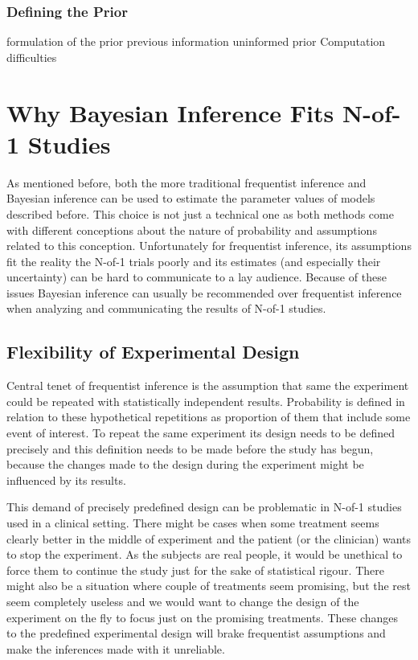 \documentclass[12pt,a4paper,leqno]{report}
\theoremstyle{plain}
\theoremstyle{definition}
\theoremstyle{remark}
\begin{document}
\subsubsection{Defining the Prior}\label{bayesproblems}

formulation of the prior
previous information
uninformed prior
Computation difficulties

\section{Why Bayesian Inference Fits N-of-1 Studies}\label{whybayes}

As mentioned before, both the more traditional frequentist inference and Bayesian inference can
be used to estimate the parameter values of models described before. This choice is not just a technical
one as both methods come with different conceptions about the nature of probability and assumptions
related to this conception. Unfortunately for frequentist inference, its assumptions fit the reality
the N-of-1 trials poorly and its estimates (and especially their uncertainty) can be hard to communicate
to a lay audience. Because of these issues Bayesian inference can usually be recommended over frequentist
inference when analyzing and communicating the results of N-of-1 studies.

\subsection{Flexibility of Experimental Design}\label{whybayes}

Central tenet of frequentist inference is the assumption that same the experiment could be repeated with
statistically independent results. Probability is defined in relation to these hypothetical repetitions
as proportion of them that include some event of interest.
To repeat the same experiment its design needs to be defined precisely
and this definition needs to be made before the study has begun,
because the changes made to the design during the experiment might be influenced by its results.

This demand of precisely predefined design can be problematic in N-of-1 studies used in a clinical setting.
There might be cases when some treatment seems clearly better in the middle of experiment and the patient
(or the clinician) wants to stop the experiment.
As the subjects are real people, it would be unethical to force them to continue the study just for the sake
of statistical rigour.
There might also be a situation where couple of treatments seem promising, but the rest seem completely useless
and we would want to change the design of the experiment on the fly to focus just on the promising treatments.
These changes to the predefined experimental design will brake frequentist assumptions and make
the inferences made with it unreliable.
\end{document}

